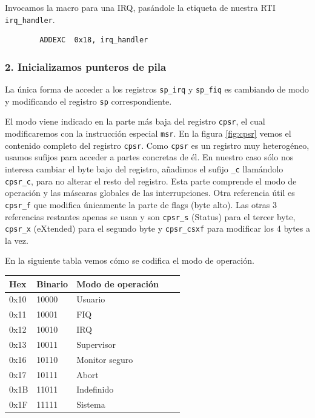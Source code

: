   Invocamos la macro para una IRQ, pasándole la etiqueta de nuestra RTI {\tt irq\_handler}.
\begin{lstlisting}
        ADDEXC  0x18, irq_handler
\end{lstlisting}

\subsubsection{2. Inicializamos punteros de pila}

La única forma de acceder a los registros {\tt sp_irq} y {\tt sp_fiq} es cambiando de modo
 y modificando el registro {\tt sp} correspondiente.

El modo viene indicado en la parte más baja del registro {\tt cpsr}, el cual modificaremos
con la instrucción especial {\tt msr}. En la figura \ref{fig:cpsr} vemos el contenido completo
del registro {\tt cpsr}. Como {\tt cpsr} es un registro muy heterogéneo, usamos
sufijos para acceder a partes concretas de él. En nuestro caso sólo nos
interesa cambiar el byte bajo del registro, añadimos el sufijo {\tt \_c} llamándolo {\tt cpsr\_c},
para no alterar el resto del registro. Esta parte comprende el modo de operación
y las máscaras globales de las interrupciones. Otra referencia útil es {\tt cpsr\_f} que modifica
únicamente la parte de flags (byte alto). Las otras 3 referencias restantes apenas se usan y
son {\tt cpsr\_s} (Status) para el tercer byte, {\tt cpsr\_x} (eXtended) para el segundo byte y
{\tt cpsr\_csxf} para modificar los 4 bytes a la vez.

En la siguiente tabla vemos cómo se codifica el modo de operación.

\begin{longtable}{ p{1.8cm} | p{2cm} | p{5cm} | p{1cm} | p{1cm} }
\hline
{\bf Hex} & {\bf Binario} & {\bf Modo de operación} \\ \hline
0x10 & 10000 & Usuario        \\ \hline
0x11 & 10001 & FIQ            \\ \hline
0x12 & 10010 & IRQ            \\ \hline
0x13 & 10011 & Supervisor     \\ \hline
0x16 & 10110 & Monitor seguro \\ \hline
0x17 & 10111 & Abort          \\ \hline
0x1B & 11011 & Indefinido     \\ \hline
0x1F & 11111 & Sistema        \\ \hline
\end{longtable}

